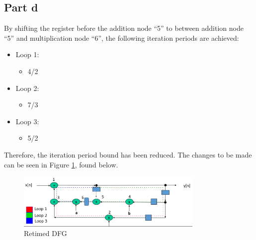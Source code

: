 \subsection{Part d}

By shifting the register before the addition node ``5'' to between addition node
``5'' and multiplication node ``6'', the following iteration periods are
achieved:

\begin{itemize}
	\item Loop 1:
	\begin{itemize}
		\item 4/2
	\end{itemize}
	\item Loop 2:
	\begin{itemize}
		\item 7/3
	\end{itemize}
	\item Loop 3:
	\begin{itemize}
		\item 5/2
	\end{itemize}
\end{itemize}

Therefore, the iteration period bound has been reduced.
The changes to be made can be seen in Figure \ref{fig:Q3dImg}, found below.

\begin{figure}[H]
	\centering
	\includegraphics[width=0.8\textwidth]{images/DFGTimedLoop}
	\caption{Retimed DFG}
	\label{fig:Q3dImg}
\end{figure}
